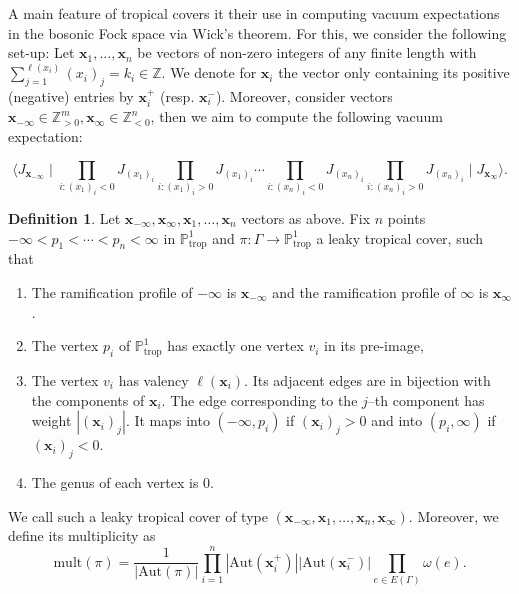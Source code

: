\documentclass[10pt,a4paper,oneside,no-math,reqno]{amsart}%
\theoremstyle{plain}
\theoremstyle{definition}
\newtheorem{definition}[theorem]{Definition}
\theoremstyle{remark}
\numberwithin{equation}{section}
\newcommand{\1}{\mathds{1}}
\newcommand{\<}{\langle}
\renewcommand{\>}{\rangle}
\begin{document}
A main feature of tropical covers it their use in computing vacuum expectations in the bosonic Fock space via Wick's theorem. For this, we consider the following set-up: Let $\mathbf{x}_1,\dots,\mathbf{x}_n$ be vectors of non-zero integers of any finite length with $\sum_{j=1}^{\ell(x_i)} (x_i)_j=k_i\in\mathbb{Z}$. We denote for $\mathbf{x}_i$ the vector only containing its positive (negative) entries by $\mathbf{x}_i^+$ (resp. $\mathbf{x}_i^-$). Moreover, consider vectors $\mathbf{x}_{-\infty} \in\mathbb{Z}_{>0}^m,\mathbf{x}_\infty \in \mathbb{Z}_{<0}^n$, then we aim to compute the following vacuum expectation:

\begin{equation}
\label{equ:vacc}
    \langle J_{\mathbf{x}_{-\infty}} \mid \prod_{i\colon (x_1)_i<0} J_{(x_1)_i} \prod_{i\colon (x_1)_i>0} J_{(x_1)_i} \cdots \prod_{i\colon (x_n)_i<0} J_{(x_n)_i} \prod_{i\colon (x_n)_i>0} J_{(x_n)_i} \mid J_{\mathbf{x}_\infty}\rangle.
\end{equation}

\begin{definition}
   Let $\mathbf{x}_{-\infty},\mathbf{x}_\infty,\mathbf{x}_1,\dots,\mathbf{x}_n$ vectors as above. Fix $n$ points $-\infty<p_1<\cdots<p_n<\infty$ in $\mathbb{P}^1_{\textrm{trop}}$ and $\pi\colon\Gamma\to\mathbb{P}^1_{\textrm{trop}}$ a leaky tropical cover, such that
   \begin{enumerate}
       \item The ramification profile of $-\infty$ is $\mathbf{x}_{-\infty}$ and the ramification profile of $\infty$ is $\mathbf{x}_\infty$.
       \item The vertex $p_i$ of $\mathbb{P}^1_{\textrm{trop}}$ has exactly one vertex $v_i$ in its pre-image,
       \item The vertex $v_i$ has valency $\ell(\mathbf{x}_i)$. Its adjacent edges are in bijection with the components of $\mathbf{x}_i$. The edge corresponding to the $j$--th component has weight $|(\mathbf{x}_i)_j|$. It maps into $(-\infty,p_i)$ if $(\mathbf{x}_i)_j>0$ and into $(p_i,\infty)$ if $(\mathbf{x}_i)_j<0$.
       \item The genus of each vertex is $0$.
   \end{enumerate}

   We call such a leaky tropical cover of type $(\mathbf{x}_{-\infty},\mathbf{x}_1,\dots,\mathbf{x}_n,\mathbf{x}_\infty)$. Moreover, we define its multiplicity as
   \begin{equation}
       \mathrm{mult}(\pi)
       =
       \frac{1}{|\mathrm{Aut}(\pi)|} \prod_{i=1}^n |\mathrm{Aut}(\mathbf{x}_i^+)| |\mathrm{Aut}(\mathbf{x}_i^-)| \prod_{e\in E(\Gamma)} \omega(e).
   \end{equation}
\end{definition}
\end{document}
